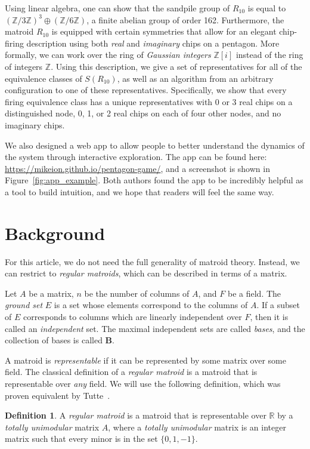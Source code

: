 \documentclass[12p]{amsart}
\numberwithin{equation}{section}
\theoremstyle{plain}
\theoremstyle{definition}
\newtheorem{defn}[thm]{Definition}
\newcommand{\Z}{\mathbb {Z}}
\begin{document}
Using linear algebra, one can show that the sandpile group of $R_{10}$ is equal to $(\Z/3\Z)^3 \oplus (\Z/6\Z)$, a finite abelian group of order 162. Furthermore, the matroid $R_{10}$ is equipped with certain symmetries that allow for an elegant chip-firing description using both \emph{real} and \emph{imaginary} chips on a pentagon. More formally, we can work over the ring of \emph{Gaussian integers} $\Z[i]$ instead of the ring of integers $\Z$. Using this description, we give a set of representatives for all of the equivalence classes of $S(R_{10})$, as well as an algorithm from an arbitrary configuration to one of these representatives. Specifically, we show that every firing equivalence class has a unique representatives with 0 or 3 real chips on a distinguished node, 0, 1, or 2 real chips on each of four other nodes, and no imaginary chips. 

We also designed a web app to allow people to better understand the dynamics of the system through interactive exploration. The app can be found here: \url{https://mikeion.github.io/pentagon-game/}, and a screenshot is shown in Figure~\ref{fig:app_example}. Both authors found the app to be incredibly helpful as a tool to build intuition, and we hope that readers will feel the same way. 

\section{Background} 

For this article, we do not need the full generality of matroid theory. Instead, we can restrict to \emph{regular matroids}, which can be described in terms of a matrix.

Let $A$ be a matrix, $n$ be the number of columns of $A$, and $F$ be a field. The \emph{ground set} $E$ is a set whose elements correspond to the columns of $A$. If a subset of $E$ corresponds to columns which are linearly independent over $F$, then it is called an \emph{independent} set. The maximal independent sets are called \emph{bases}, and the collection of bases is called $\mathbf B$.

A matroid is \emph{representable} if it can be represented by some matrix over some field. The classical definition of a \emph{regular matroid} is a matroid that is representable over \emph{any} field. We will use the following definition, which was proven equivalent by Tutte~\cite{Tutte}. 
\begin{defn}
    A \emph{regular matroid} is a matroid that is representable over $\mathbb R$ by a \emph{totally unimodular} matrix $A$, where a \emph{totally unimodular} matrix is an integer matrix such that every minor is in the set $\{0, 1,-1\}$. 
\end{defn}
\end{document}
